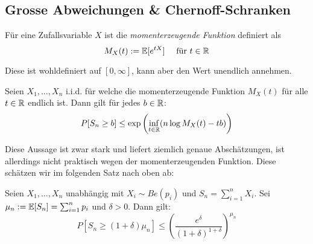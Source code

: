 \subsection{Grosse Abweichungen \& Chernoff-Schranken}
\begin{definition}
Für eine Zufallsvariable $X$ ist die \textit{momenterzeugende Funktion} definiert als
$$ M_X(t) := \mathbb{E}[e^{tX}] \quad \mbox{ für } t\in \mathbb{R}$$
\end{definition}
Diese ist wohldefiniert auf $[0,\infty]$, kann aber den Wert unendlich annehmen.
\begin{satz}
Seien $X_1,\dots,X_n$ i.i.d. für welche die momenterzeugende Funktion $M_X(t)$ für alle $t\in\mathbb{R}$ endlich ist. Dann gilt für jedes $b\in\mathbb{R}$:
$$ P[S_n \geq b] \leq \exp\left( \inf_{t\in\mathbb{R}} (n\log M_X(t) - tb) \right)$$
\end{satz}
Diese Aussage ist zwar stark und liefert ziemlich genaue Abschätzungen, ist allerdings nicht praktisch wegen der momenterzeugenden Funktion. Diese schätzen wir im folgenden Satz nach oben ab:

\begin{satz}
Seien $X_1,\dots,X_n$ unabhängig mit $X_i \sim Be(p_i)$ und $S_n = \sum_{i=1}^n X_i$. Sei $\mu_n := \mathbb{E}[S_n] = \sum_{i=1}^n p_i$ und $\delta > 0$. Dann gilt:
$$
	P[S_n \geq (1+\delta) \mu_n] \leq
	\left(
		\frac{e^\delta}{(1+\delta)^{1+\delta}}
	\right)
	^{\mu_n}
$$
\end{satz}










